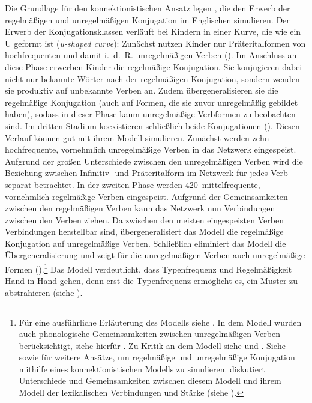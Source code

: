  
Die Grundlage für den konnektionistischen Ansatz legen \textcite{Rumelhart.1986}, die den Erwerb der regelmäßigen und unregelmäßigen Konjugation im Englischen simulieren. Der Erwerb der Konjugationsklassen verläuft bei Kindern in einer Kurve, die wie ein U geformt ist (\textit{u-shaped curve}): Zunächst nutzen Kinder nur Präteritalformen von hochfrequenten und damit i.~d.~R. unregelmäßigen Verben (\cite[219--220]{Rumelhart.1986}). Im Anschluss an diese Phase erwerben Kinder die regelmäßige Konjugation. Sie konjugieren dabei nicht nur bekannte Wörter nach der regelmäßigen Konjugation, sondern wenden sie produktiv auf unbekannte Verben an. Zudem übergeneralisieren sie die regelmäßige Konjugation (auch auf Formen, die sie zuvor unregelmäßig gebildet haben), sodass in dieser Phase kaum unregelmäßige Verbformen zu beobachten sind. Im dritten Stadium koexistieren schließlich beide Konjugationen (\cite[219--220]{Rumelhart.1986}). Diesen Verlauf können \textcite{Rumelhart.1986} gut mit ihrem Modell simulieren. Zunächst werden zehn hochfrequente, vornehmlich unregelmäßige Verben in das Netzwerk eingespeist. Aufgrund der großen Unterschiede zwischen den unregelmäßigen Verben wird die Beziehung zwischen Infinitiv- und Präteritalform im Netzwerk für jedes Verb separat betrachtet. In der zweiten Phase werden 420~mittelfrequente, vornehmlich regelmäßige Verben eingespeist. Aufgrund der Gemeinsamkeiten zwischen den regelmäßigen Verben kann das Netzwerk nun Verbindungen zwischen den Verben ziehen. Da zwischen den meisten eingespeisten Verben Verbindungen herstellbar sind, übergeneralisiert das Modell die regelmäßige Konjugation auf unregelmäßige Verben. Schließlich eliminiert das Modell die Übergeneralisierung und zeigt für die unregelmäßigen Verben auch unregelmäßige Formen (\cite[230--231, 240--246]{Rumelhart.1986}).\footnote{Für eine ausführliche Erläuterung des Modells siehe \textcite[220--240]{Rumelhart.1986}. In dem Modell wurden auch phonologische Gemeinsamkeiten zwischen unregelmäßigen Verben berücksichtigt, siehe hierfür \textcite[245--266]{Rumelhart.1986}. Zu Kritik an dem Modell siehe \textcite{Pinker.1988} und \textcite[232--233]{Pinker.1991}. Siehe \textcite{Plunkett.1991} sowie \textcite{Daugherty.1994} für weitere Ansätze, um regelmäßige und unregelmäßige Konjugation mithilfe eines konnektionistischen Modells zu simulieren. \textcite[136--138]{Bybee.1988} diskutiert Unterschiede und Gemeinsamkeiten zwischen diesem Modell und ihrem Modell der lexikalischen Verbindungen und Stärke (siehe ).} Das Modell verdeutlicht, dass Typenfrequenz und Regelmäßigkeit Hand in Hand gehen, denn erst die Typenfrequenz ermöglicht es, ein Muster zu abstrahieren (siehe ). 

